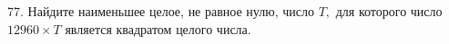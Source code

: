 77. Найдите наименьшее целое, не равное нулю, число $T,$ для которого число $12960\times T$ является квадратом целого числа.\\
